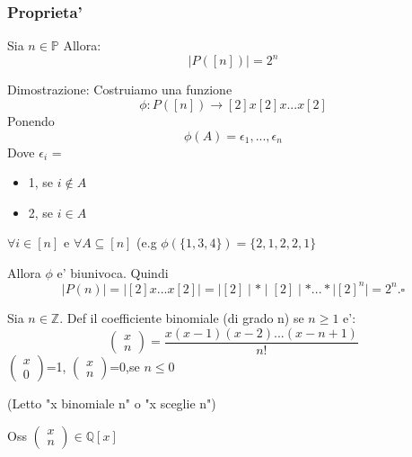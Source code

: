 \documentclass{article}
\begin{document}
      \subsubsection{Proprieta'}
      \begin{flushleft}
        Sia $n \in \mathbb{P}$ Allora:
        \begin{equation}
          \mid P([n]) \mid = 2^n
        \end{equation}
      \end{flushleft}
      \begin{flushleft}
        Dimostrazione: Costruiamo una funzione
        \begin{equation}
          \phi : P([n]) \to [2]x[2]x...x[2]
        \end{equation}
        Ponendo
        \begin{equation}
          \phi (A) = \epsilon_1,...,\epsilon_n
        \end{equation}
        Dove $\epsilon_i$ = 
        \begin{itemize}
          \item 1, se $i \notin A$
          \item 2, se $i \in A$
        \end{itemize}
      $\forall i \in [n]$ e $\forall A \subseteq [n]$ (e.g $\phi(\{1,3,4\})=\{2,1,2,2,1\}$
      \end{flushleft}
      \begin{flushleft}
        Allora $\phi$ e' biunivoca. Quindi
        \begin{equation}
          \mid P(n) \mid = \mid [2]x...x[2] \mid = \mid [2] \mid * \mid [2] \mid * ... * \mid [2]^n \mid = 2^n. \square
        \end{equation}
      \end{flushleft}
      \begin{flushleft}
        Sia $n \in \mathbb{Z}$. Def il coefficiente binomiale (di grado n) se $n \geq 1$ e':
        \begin{equation}
          \begin{pmatrix}
            x \\ 
            n
          \end{pmatrix} = \frac{x(x-1)(x-2)...(x-n+1)}{n!}
        \end{equation}
        $\begin{pmatrix}
          x \\ 
          0
        \end{pmatrix}$=1,
        $\begin{pmatrix}
          x \\ 
          n
        \end{pmatrix}$=0,se $n \leq 0$
      \end{flushleft}
      \begin{flushleft}
        (Letto "x binomiale n" o "x sceglie n")
      \end{flushleft}
      \begin{flushleft}
        Oss $\begin{pmatrix}
          x \\ 
          n
        \end{pmatrix} \in \mathbb{Q}[x]$
      \end{flushleft}
\end{document}
